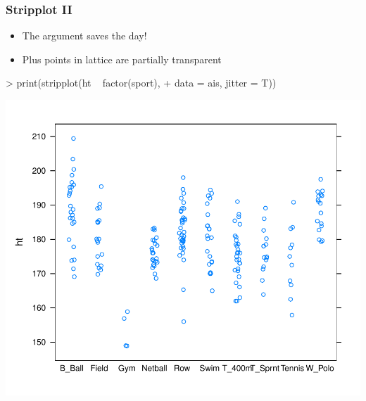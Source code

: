 \begin{frame}
  \frametitle{Stripplot II}
  \begin{itemize}
  \item The  argument saves the day!
  \item Plus points in lattice are partially transparent
  \end{itemize}
\begin{Schunk}
\begin{Sinput}
> print(stripplot(ht ~ factor(sport), 
+     data = ais, jitter = T))
\end{Sinput}
\end{Schunk}
\includegraphics{plots/fig-019}
\end{frame}

